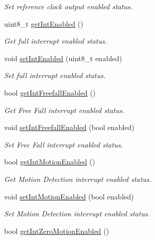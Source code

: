 \begin{DoxyCompactItemize}
\begin{DoxyCompactList}\small\item\em Set reference clock output enabled status. \end{DoxyCompactList}\item 
uint8\+\_\+t \mbox{\hyperlink{classMPU6050_a295c9600579557df065aff88bc7a1d83}{get\+Int\+Enabled}} ()
\begin{DoxyCompactList}\small\item\em Get full interrupt enabled status. \end{DoxyCompactList}\item 
void \mbox{\hyperlink{classMPU6050_ac7bcf24249dd5000320a8ec0ffe488c6}{set\+Int\+Enabled}} (uint8\+\_\+t enabled)
\begin{DoxyCompactList}\small\item\em Set full interrupt enabled status. \end{DoxyCompactList}\item 
bool \mbox{\hyperlink{classMPU6050_a500bb2df2e46eaecd3fb2ba7304a5ed3}{get\+Int\+Freefall\+Enabled}} ()
\begin{DoxyCompactList}\small\item\em Get Free Fall interrupt enabled status. \end{DoxyCompactList}\item 
void \mbox{\hyperlink{classMPU6050_a01a24a05f06463d5277e1670d6260e03}{set\+Int\+Freefall\+Enabled}} (bool enabled)
\begin{DoxyCompactList}\small\item\em Set Free Fall interrupt enabled status. \end{DoxyCompactList}\item 
bool \mbox{\hyperlink{classMPU6050_a7de31a8e9f22765329d9f9e02db2f1f0}{get\+Int\+Motion\+Enabled}} ()
\begin{DoxyCompactList}\small\item\em Get Motion Detection interrupt enabled status. \end{DoxyCompactList}\item 
void \mbox{\hyperlink{classMPU6050_a2d2d1d3b03198a09c83a48ec3bc20bd8}{set\+Int\+Motion\+Enabled}} (bool enabled)
\begin{DoxyCompactList}\small\item\em Set Motion Detection interrupt enabled status. \end{DoxyCompactList}\item 
bool \mbox{\hyperlink{classMPU6050_ab3cc9bcaca6cec61e7f3f0c6c8a37db5}{get\+Int\+Zero\+Motion\+Enabled}} ()

\end{DoxyCompactItemize}
